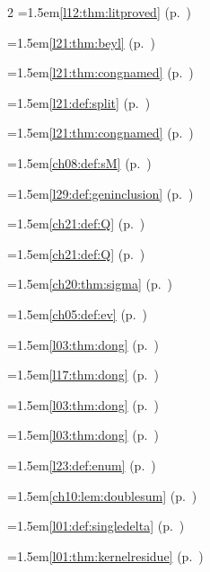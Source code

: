 \begin{multicols}{2}
\hangindent=1.5em\quad \ref{l12:thm:litproved} (p.~\pageref{l12:thm:litproved})\par
\hangindent=1.5em\quad \ref{l21:thm:beyl} (p.~\pageref{l21:thm:beyl})\par
\hangindent=1.5em\quad \ref{l21:thm:congnamed} (p.~\pageref{l21:thm:congnamed})\par
\hangindent=1.5em\quad \ref{l21:def:split} (p.~\pageref{l21:def:split})\par
\hangindent=1.5em\quad \ref{l21:thm:congnamed} (p.~\pageref{l21:thm:congnamed})\par
\hangindent=1.5em\quad \ref{ch08:def:sM} (p.~\pageref{ch08:def:sM})\par
\hangindent=1.5em\quad \ref{l29:def:geninclusion} (p.~\pageref{l29:def:geninclusion})\par
\hangindent=1.5em\quad \ref{ch21:def:Q} (p.~\pageref{ch21:def:Q})\par
\hangindent=1.5em\quad \ref{ch21:def:Q} (p.~\pageref{ch21:def:Q})\par
\hangindent=1.5em\quad \ref{ch20:thm:sigma} (p.~\pageref{ch20:thm:sigma})\par
\hangindent=1.5em\quad \ref{ch05:def:ev} (p.~\pageref{ch05:def:ev})\par
\hangindent=1.5em\quad \ref{l03:thm:dong} (p.~\pageref{l03:thm:dong})\par
\hangindent=1.5em\quad \ref{l17:thm:dong} (p.~\pageref{l17:thm:dong})\par
\hangindent=1.5em\quad \ref{l03:thm:dong} (p.~\pageref{l03:thm:dong})\par
\hangindent=1.5em\quad \ref{l03:thm:dong} (p.~\pageref{l03:thm:dong})\par
\hangindent=1.5em\quad \ref{l23:def:enum} (p.~\pageref{l23:def:enum})\par
\hangindent=1.5em\quad \ref{ch10:lem:doublesum} (p.~\pageref{ch10:lem:doublesum})\par
\hangindent=1.5em\quad \ref{l01:def:singledelta} (p.~\pageref{l01:def:singledelta})\par
\hangindent=1.5em\quad \ref{l01:thm:kernelresidue} (p.~\pageref{l01:thm:kernelresidue})\par

\end{multicols}
